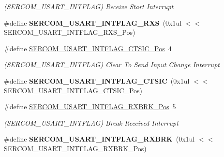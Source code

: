 \begin{DoxyCompactItemize}
\begin{DoxyCompactList}\small\item\em (S\+E\+R\+C\+O\+M\+\_\+\+U\+S\+A\+R\+T\+\_\+\+I\+N\+T\+F\+L\+A\+G) Receive Start Interrupt \end{DoxyCompactList}\item 
\hypertarget{group___s_a_m_l21___s_e_r_c_o_m_ga8613d3df6456f5b2d3ce31a36df71bea}{}\#define {\bfseries S\+E\+R\+C\+O\+M\+\_\+\+U\+S\+A\+R\+T\+\_\+\+I\+N\+T\+F\+L\+A\+G\+\_\+\+R\+X\+S}~(0x1ul $<$$<$ S\+E\+R\+C\+O\+M\+\_\+\+U\+S\+A\+R\+T\+\_\+\+I\+N\+T\+F\+L\+A\+G\+\_\+\+R\+X\+S\+\_\+\+Pos)\label{group___s_a_m_l21___s_e_r_c_o_m_ga8613d3df6456f5b2d3ce31a36df71bea}

\item 
\hypertarget{group___s_a_m_l21___s_e_r_c_o_m_gac8c617ace4ae1fcd23941b3772e23835}{}\#define \hyperlink{group___s_a_m_l21___s_e_r_c_o_m_gac8c617ace4ae1fcd23941b3772e23835}{S\+E\+R\+C\+O\+M\+\_\+\+U\+S\+A\+R\+T\+\_\+\+I\+N\+T\+F\+L\+A\+G\+\_\+\+C\+T\+S\+I\+C\+\_\+\+Pos}~4\label{group___s_a_m_l21___s_e_r_c_o_m_gac8c617ace4ae1fcd23941b3772e23835}

\begin{DoxyCompactList}\small\item\em (S\+E\+R\+C\+O\+M\+\_\+\+U\+S\+A\+R\+T\+\_\+\+I\+N\+T\+F\+L\+A\+G) Clear To Send Input Change Interrupt \end{DoxyCompactList}\item 
\hypertarget{group___s_a_m_l21___s_e_r_c_o_m_gaf2d6283681546884df4d5e1720ba1bdd}{}\#define {\bfseries S\+E\+R\+C\+O\+M\+\_\+\+U\+S\+A\+R\+T\+\_\+\+I\+N\+T\+F\+L\+A\+G\+\_\+\+C\+T\+S\+I\+C}~(0x1ul $<$$<$ S\+E\+R\+C\+O\+M\+\_\+\+U\+S\+A\+R\+T\+\_\+\+I\+N\+T\+F\+L\+A\+G\+\_\+\+C\+T\+S\+I\+C\+\_\+\+Pos)\label{group___s_a_m_l21___s_e_r_c_o_m_gaf2d6283681546884df4d5e1720ba1bdd}

\item 
\hypertarget{group___s_a_m_l21___s_e_r_c_o_m_ga24e56045bb62ed3583e1978c74da80f8}{}\#define \hyperlink{group___s_a_m_l21___s_e_r_c_o_m_ga24e56045bb62ed3583e1978c74da80f8}{S\+E\+R\+C\+O\+M\+\_\+\+U\+S\+A\+R\+T\+\_\+\+I\+N\+T\+F\+L\+A\+G\+\_\+\+R\+X\+B\+R\+K\+\_\+\+Pos}~5\label{group___s_a_m_l21___s_e_r_c_o_m_ga24e56045bb62ed3583e1978c74da80f8}

\begin{DoxyCompactList}\small\item\em (S\+E\+R\+C\+O\+M\+\_\+\+U\+S\+A\+R\+T\+\_\+\+I\+N\+T\+F\+L\+A\+G) Break Received Interrupt \end{DoxyCompactList}\item 
\hypertarget{group___s_a_m_l21___s_e_r_c_o_m_ga6e4ed4479e6c5bc271d099226ba3f5e5}{}\#define {\bfseries S\+E\+R\+C\+O\+M\+\_\+\+U\+S\+A\+R\+T\+\_\+\+I\+N\+T\+F\+L\+A\+G\+\_\+\+R\+X\+B\+R\+K}~(0x1ul $<$$<$ S\+E\+R\+C\+O\+M\+\_\+\+U\+S\+A\+R\+T\+\_\+\+I\+N\+T\+F\+L\+A\+G\+\_\+\+R\+X\+B\+R\+K\+\_\+\+Pos)\label{group___s_a_m_l21___s_e_r_c_o_m_ga6e4ed4479e6c5bc271d099226ba3f5e5}


\end{DoxyCompactItemize}
